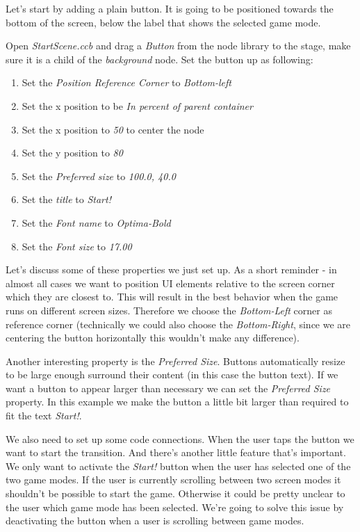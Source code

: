 Let's start by adding a plain button. It is going to be positioned towards
the bottom of the screen, below the label that shows the selected game mode.

\begin{leftbar}
Open \textit{StartScene.ccb} and drag a \textit{Button} from the node library to
the stage, make sure it is a child of the \textit{background} node.
Set the button up as following:
\begin{enumerate}
  \item Set the \textit{Position Reference Corner} to \textit{Bottom-left}
  \item Set the x position to be \textit{In percent of parent container}
  \item Set the x position to \textit{50} to center the node
  \item Set the y position to \textit{80}
  \item Set the \textit{Preferred size} to \textit{100.0, 40.0}
  \item Set the \textit{title} to \textit{Start!}
  \item Set the \textit{Font name} to \textit{Optima-Bold}
  \item Set the \textit{Font size} to \textit{17.00} 
\end{enumerate}
\end{leftbar}

Let's discuss some of these properties we just set up. As a short reminder - in
almost all cases we want to position UI elements relative to the screen corner
which they are closest to. This will result in the best behavior when the game
runs on different screen sizes. Therefore we choose the \textit{Bottom-Left}
corner as reference corner (technically we could also choose the
\textit{Bottom-Right}, since we are centering the button horizontally this
wouldn't make any difference).

Another interesting property is the \textit{Preferred Size}. Buttons
automatically resize to be large enough surround their content (in this case
the button text). If we want a button to appear larger than necessary we can set
the \textit{Preferred Size} property. In this example we make the button a
little bit larger than required to fit the text \textit{Start!}.

We also need to set up some code connections. When the user taps the button we
want to start the transition. And there's another little feature that's
important. We only want to activate the \textit{Start!} button when the user has
selected one of the two game modes. If the user is currently scrolling between
two screen modes it shouldn't be possible to start the game. Otherwise it could
be pretty unclear to the user which game mode has been selected. We're going to
solve this issue by deactivating the button when a user is scrolling between
game modes.

